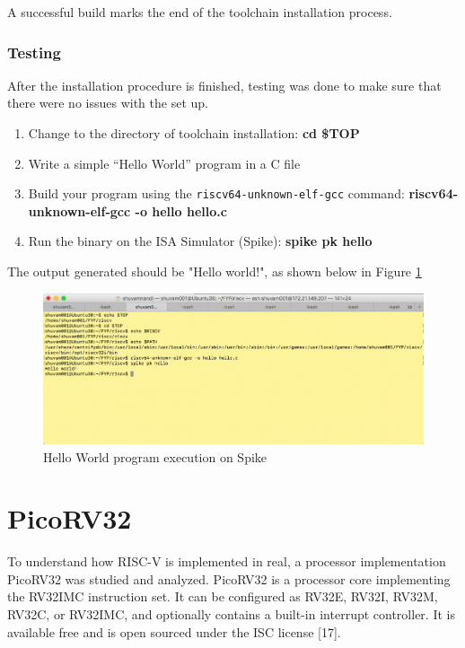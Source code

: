 A successful build marks the end of the toolchain installation process.

\subsubsection{Testing}
\label{sect6_2_2_2}
After the installation procedure is finished, testing was done to make sure that there were no issues with the set up. 
\begin{enumerate}
\item Change to the directory of toolchain installation:\newline
\small \textbf{cd \$TOP}
\item Write a simple “Hello World” program in a C file
\item Build your program using the \verb|riscv64-unknown-elf-gcc| command:\newline
\small \textbf{riscv64-unknown-elf-gcc -o hello hello.c}
\item Run the binary on the ISA Simulator (Spike):\newline
\small \textbf{spike pk hello}
\end{enumerate}

The output generated should be "Hello world!", as shown below in Figure \ref{fig:riscv3} \newline

\begin{figure}[h!]
\includegraphics[width=\linewidth]{figures/Spike_Output.png}
\caption{Hello World program execution on Spike}
\label{fig:riscv3}
\end{figure}

 \section{PicoRV32}
  \label{sect6_3}
To understand how RISC-V is implemented in real, a processor implementation PicoRV32 was studied and analyzed. PicoRV32 is a processor core implementing the RV32IMC instruction set. It can be configured as RV32E, RV32I, RV32M, RV32C, or RV32IMC, and optionally contains a built-in interrupt controller. It is available free and is open sourced under the ISC license [17]. 

